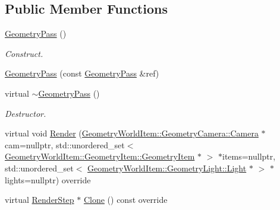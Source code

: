 \subsection*{Public Member Functions}
\begin{DoxyCompactItemize}
\item 
\mbox{\label{class_geometry_engine_1_1_geometry_render_step_1_1_geometry_pass_a304d78be51e786954783551786e83426}} 
\mbox{\hyperlink{class_geometry_engine_1_1_geometry_render_step_1_1_geometry_pass_a304d78be51e786954783551786e83426}{Geometry\+Pass}} ()
\begin{DoxyCompactList}\small\item\em Construct. \end{DoxyCompactList}\item 
\mbox{\hyperlink{class_geometry_engine_1_1_geometry_render_step_1_1_geometry_pass_a4c587bb12a23da23a1617824ccca402d}{Geometry\+Pass}} (const \mbox{\hyperlink{class_geometry_engine_1_1_geometry_render_step_1_1_geometry_pass}{Geometry\+Pass}} \&ref)
\item 
\mbox{\label{class_geometry_engine_1_1_geometry_render_step_1_1_geometry_pass_a5117039655d0d3a34184f65cfbd04c9a}} 
virtual \mbox{\hyperlink{class_geometry_engine_1_1_geometry_render_step_1_1_geometry_pass_a5117039655d0d3a34184f65cfbd04c9a}{$\sim$\+Geometry\+Pass}} ()
\begin{DoxyCompactList}\small\item\em Destructor. \end{DoxyCompactList}\item 
virtual void \mbox{\hyperlink{class_geometry_engine_1_1_geometry_render_step_1_1_geometry_pass_ac3bfd0a3915cd8a8cd7e1bf81157f6ad}{Render}} (\mbox{\hyperlink{class_geometry_engine_1_1_geometry_world_item_1_1_geometry_camera_1_1_camera}{Geometry\+World\+Item\+::\+Geometry\+Camera\+::\+Camera}} $\ast$cam=nullptr, std\+::unordered\+\_\+set$<$ \mbox{\hyperlink{class_geometry_engine_1_1_geometry_world_item_1_1_geometry_item_1_1_geometry_item}{Geometry\+World\+Item\+::\+Geometry\+Item\+::\+Geometry\+Item}} $\ast$ $>$ $\ast$items=nullptr, std\+::unordered\+\_\+set$<$ \mbox{\hyperlink{class_geometry_engine_1_1_geometry_world_item_1_1_geometry_light_1_1_light}{Geometry\+World\+Item\+::\+Geometry\+Light\+::\+Light}} $\ast$ $>$ $\ast$lights=nullptr) override
\item 
virtual \mbox{\hyperlink{class_geometry_engine_1_1_geometry_render_step_1_1_render_step}{Render\+Step}} $\ast$ \mbox{\hyperlink{class_geometry_engine_1_1_geometry_render_step_1_1_geometry_pass_a12e85a0169cb7b92cb8bd7b7fe100b33}{Clone}} () const override
\end{DoxyCompactItemize}
